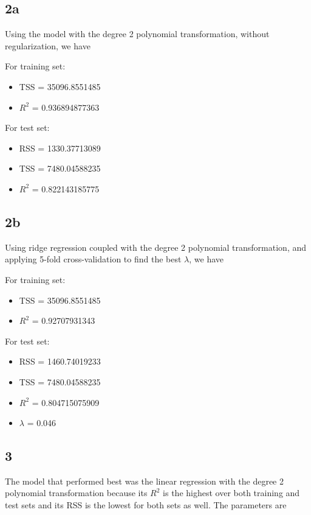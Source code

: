 \documentclass[leqno]{article}
\begin{document}
\subsection*{2a} Using the model with the degree 2 polynomial transformation, without regularization, we have

For training set:
\begin{itemize}
\item TSS = 35096.8551485
\item $R^2$ = 0.936894877363
\end{itemize}

For test set:
\begin{itemize}
\item RSS = 1330.37713089
\item TSS = 7480.04588235
\item $R^2$ = 0.822143185775
\end{itemize}

\subsection*{2b} Using ridge regression coupled with the degree 2 polynomial transformation, and applying 
5-fold cross-validation to find the best $\lambda$, we have

For training set:
\begin{itemize}
\item TSS = 35096.8551485
\item $R^2$ = 0.92707931343
\end{itemize}

For test set:
\begin{itemize}
\item RSS = 1460.74019233
\item TSS = 7480.04588235
\item $R^2$ = 0.804715075909
\item $\lambda$ = 0.046
\end{itemize}

\subsection*{3} The model that performed best was the linear regression with the degree 2 
polynomial transformation because its $R^2$ is the highest over both training and test sets and its RSS is the lowest for both sets as well. The parameters are
 
\end{document}
